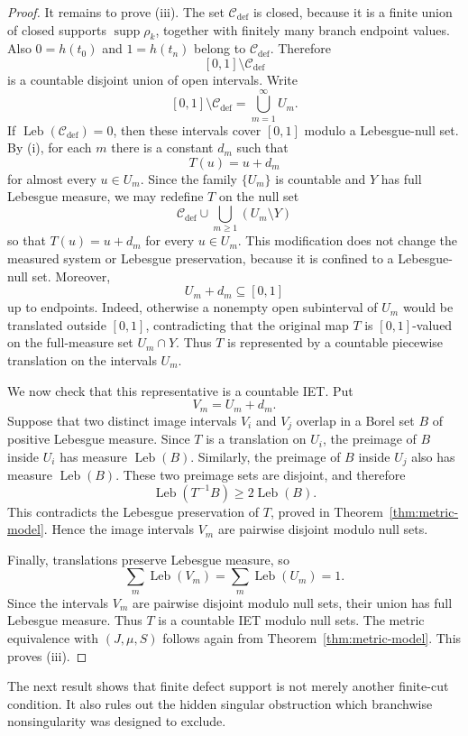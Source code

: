 \documentclass[11pt]{amsart}
\theoremstyle{plain}
\theoremstyle{definition}
\theoremstyle{remark}
\DeclareMathOperator{\supp}{supp}
\DeclareMathOperator{\Leb}{Leb}
\newcommand{\cC}{\mathcal C}
\begin{document}
\begin{proof}
It remains to prove (iii). The set \(\cC_{\mathrm{def}}\) is closed, because it is a finite
union of closed supports \(\supp\rho_k\), together with finitely many branch endpoint values.
Also \(0=h(t_0)\) and \(1=h(t_n)\) belong to \(\cC_{\mathrm{def}}\). Therefore
\[
        [0,1]\setminus \cC_{\mathrm{def}}
\]
is a countable disjoint union of open intervals. Write
\[
        [0,1]\setminus \cC_{\mathrm{def}}=\bigcup_{m=1}^{\infty} U_m.
\]
If \(\Leb(\cC_{\mathrm{def}})=0\), then these intervals cover \([0,1]\) modulo a Lebesgue-null
set. By (i), for each \(m\) there is a constant \(d_m\) such that
\[
        T(u)=u+d_m
\]
for almost every \(u\in U_m\). Since the family \(\{U_m\}\) is countable and \(Y\) has
full Lebesgue measure, we may redefine \(T\) on the null set
\[
        \cC_{\mathrm{def}}\cup\bigcup_{m\geq1}(U_m\setminus Y)
\]
so that \(T(u)=u+d_m\) for every \(u\in U_m\). This modification does not change the
measured system or Lebesgue preservation, because it is confined to a Lebesgue-null set.
Moreover,
\[
        U_m+d_m\subseteq[0,1]
\]
up to endpoints. Indeed, otherwise a nonempty open subinterval of \(U_m\) would be
translated outside \([0,1]\), contradicting that the original map \(T\) is
\([0,1]\)-valued on the full-measure set \(U_m\cap Y\). Thus \(T\) is represented by a
countable piecewise translation on the intervals \(U_m\).

We now check that this representative is a countable IET.
Put
\[
        V_m=U_m+d_m.
\]
Suppose that two distinct image intervals \(V_i\) and \(V_j\) overlap in a Borel set \(B\)
of positive Lebesgue measure. Since \(T\) is a translation on \(U_i\), the preimage of \(B\)
inside \(U_i\) has measure \(\Leb(B)\). Similarly, the preimage of \(B\) inside \(U_j\) also
has measure \(\Leb(B)\). These two preimage sets are disjoint, and therefore
\[
        \Leb(T^{-1}B)\geq 2\Leb(B).
\]
This contradicts the Lebesgue preservation of \(T\), proved in Theorem~\ref{thm:metric-model}.
Hence the image intervals \(V_m\) are pairwise disjoint modulo null sets.

Finally, translations preserve Lebesgue measure, so
\[
        \sum_m \Leb(V_m)=\sum_m \Leb(U_m)=1.
\]
Since the intervals \(V_m\) are pairwise disjoint modulo null sets, their union has full
Lebesgue measure. Thus \(T\) is a countable IET modulo null
sets. The metric equivalence with \((J,\mu,S)\) follows again from Theorem~\ref{thm:metric-model}.
This proves (iii).
\end{proof}

The next result shows that finite defect support is not merely another finite-cut
condition. It also rules out the hidden singular obstruction which branchwise
nonsingularity was designed to exclude.
\end{document}
